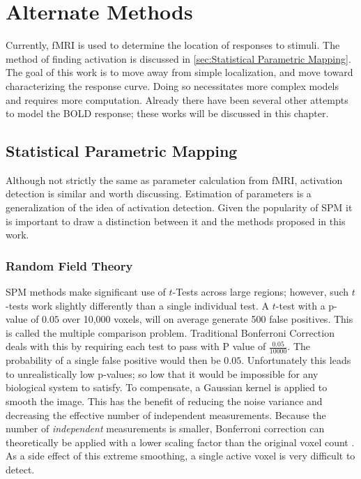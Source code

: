 \chapter{Alternate Methods}
\label{sec:Prior Works}
Currently, \ac{fMRI} is used to determine the location of responses
to stimuli. The method of finding activation is discussed in 
\autoref{sec:Statistical Parametric Mapping}. The goal of this 
work is to move away from simple localization, and move toward
characterizing the response curve. Doing so 
necessitates more complex models and requires
more computation. Already there have been several other
attempts to model the \ac{BOLD} response; these works will be discussed
in this chapter.

\section{Statistical Parametric Mapping}
\label{sec:Statistical Parametric Mapping}
Although not strictly the same as parameter calculation from 
\ac{fMRI}, activation detection is similar and worth discussing. Estimation of 
parameters is a generalization of the idea 
of activation detection.
Given the popularity of \ac{SPM}
it is important to draw a distinction between it and the methods proposed
in this work.

\subsection{Random Field Theory}
\label{sec:RFT}
\ac{SPM} methods make significant use of $t$-Tests across large regions;
however, such $t$-tests work slightly differently than a single
individual test. A $t$-test with a p-value of $0.05$ over 
10,000 voxels, will on average generate 500 false
positives. This is called the multiple comparison problem. Traditional
Bonferroni Correction
deals with this by requiring each test to pass with P
value of $\frac{0.05}{10000}$. The probability of 
a single false positive would then be $0.05$. Unfortunately this leads to unrealistically
low p-values; so low that it would be impossible for any biological system to satisfy. To
compensate, a Gaussian kernel is applied to smooth the image. This has
the benefit of reducing the noise variance and 
decreasing the effective number of independent measurements. Because
the number of \emph{independent} measurements is smaller, Bonferroni correction
can theoretically be applied with a lower scaling factor than
the original voxel count \cite{Worsley2004}. As a side effect of this 
extreme smoothing, a single active voxel is very difficult to detect.

